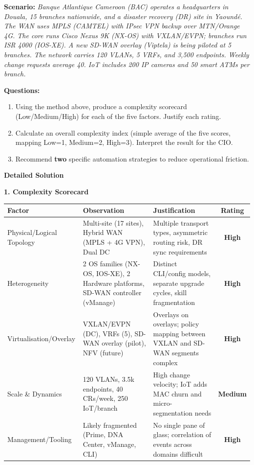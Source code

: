 \documentclass[11pt]{article}
\begin{document}
\begin{exoresolu}
\textbf{Scenario:} \textit{Banque Atlantique Cameroon (BAC) operates a headquarters in Douala, 15 branches nationwide, and a disaster recovery (DR) site in Yaound\'e. The WAN uses MPLS (CAMTEL) with IPsec VPN backup over MTN/Orange 4G. The core runs Cisco Nexus 9K (NX-OS) with VXLAN/EVPN; branches run ISR 4000 (IOS-XE). A new SD-WAN overlay (Viptela) is being piloted at 5 branches. The network carries 120 VLANs, 5 VRFs, and 3,500 endpoints. Weekly change requests average 40. IoT includes 200 IP cameras and 50 smart ATMs per branch.}

\textbf{Questions:}
\begin{enumerate}
    \item Using the method above, produce a complexity scorecard (Low/Medium/High) for each of the five factors. Justify each rating.
    \item Calculate an overall complexity index (simple average of the five scores, mapping Low=1, Medium=2, High=3). Interpret the result for the CIO.
    \item Recommend \textbf{two} specific automation strategies to reduce operational friction.
\end{enumerate}
\tcblower
\textbf{Detailed Solution}

\noindent\textbf{1. Complexity Scorecard}

\begin{center}
\begin{tabularx}{\linewidth}{|l|X|X|c|}
\hline
\rowcolor{popblueL}
\textbf{Factor} & \textbf{Observation} & \textbf{Justification} & \textbf{Rating} \\
\hline
Physical/Logical Topology & Multi-site (17 sites), Hybrid WAN (MPLS + 4G VPN), Dual DC & Multiple transport types, asymmetric routing risk, DR sync requirements & \textbf{High} \\
\hline
Heterogeneity & 2 OS families (NX-OS, IOS-XE), 2 Hardware platforms, SD-WAN controller (vManage) & Distinct CLI/config models, separate upgrade cycles, skill fragmentation & \textbf{High} \\
\hline
Virtualisation/Overlay & VXLAN/EVPN (DC), VRFs (5), SD-WAN overlay (pilot), NFV (future) & Overlays on overlays; policy mapping between VXLAN and SD-WAN segments complex & \textbf{High} \\
\hline
Scale \& Dynamics & 120 VLANs, 3.5k endpoints, 40 CRs/week, 250 IoT/branch & High change velocity; IoT adds MAC churn and micro-segmentation needs & \textbf{Medium} \\
\hline
Management/Tooling & Likely fragmented (Prime, DNA Center, vManage, CLI) & No single pane of glass; correlation of events across domains difficult & \textbf{High} \\
\hline
\end{tabularx}
\end{center}


\end{exoresolu}
\end{document}

